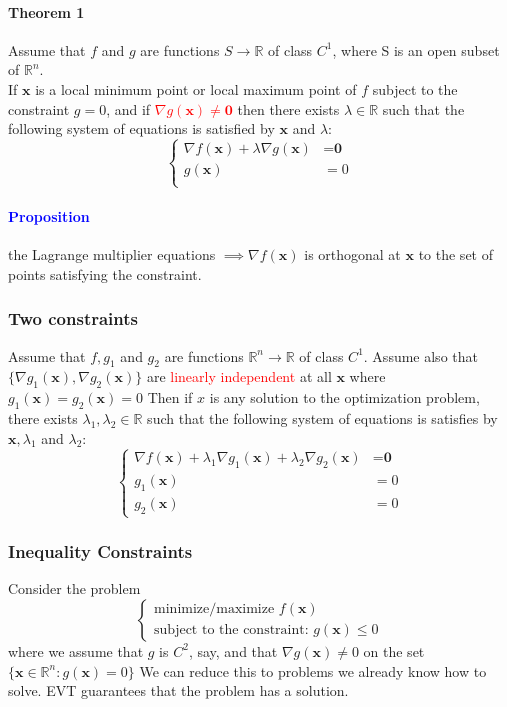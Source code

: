 \documentclass[11pt]{article}
\newcommand{\tb}[1]{\textbf{#1}}
\newcommand{\real}[0]{\mathbb{R}}
\newcommand{\vx}[0]{\tb{x}}
\newcommand{\vo}[0]{\tb{0}}
\begin{document}
\paragraph{Theorem 1}
Assume that $f$ and $g$ are functions $S \rightarrow \real$ of class $C^1$, where S is an open subset of $\real^n$.\\
If $\vx$ is a local minimum point or local maximum point of $f$ subject to the constraint $g = 0$, and if \textcolor{red}{$\nabla g(\vx) \neq \vo$} then there exists $\lambda \in \real$ such that the following system of equations is satisfied by $\vx$ and $\lambda$:
\begin{equation*}
\begin{cases}
  \nabla f(\tb{x}) + \lambda \nabla g(\tb{x}) &= \tb{0} \\
  g(\tb{x}) &= 0\\
\end{cases}
\end{equation*}


\paragraph{\textcolor{blue}{Proposition}}
the Lagrange multiplier equations $\implies \nabla f(\vx)$ is orthogonal at $\vx$ to the set of points satisfying the constraint.
\subsubsection{Two constraints}
Assume that $f, g_1$ and $g_2$ are functions $\real^n \rightarrow \real$ of class $C^1$. Assume also that $\{ \nabla g_1(\tb{x}), \nabla g_2(\tb{x})\}$ are \textcolor{red}{linearly independent} at all $\tb{x}$ where $g_1(\tb{x}) = g_2(\tb{x}) = 0$ \newline
Then if $x$ is any solution to the optimization problem, there exists $\lambda_1, \lambda_2 \in \real$ such that the following system of equations is satisfies by $\tb{x}, \lambda_1$ and $\lambda_2$:
\begin{equation*}
\begin{cases}
  \nabla f(\tb{x}) + \lambda_1 \nabla g_1(\tb{x}) + \lambda_2 \nabla g_2(\tb{x}) &= \tb{0} \\
  g_1(\tb{x}) &= 0\\
  g_2(\tb{x}) &= 0
\end{cases}
\end{equation*}
\subsubsection{Inequality Constraints}
Consider the problem
\begin{equation*}
    \begin{cases}
        \mbox{minimize/maximize } f(\tb{x})\\
        \mbox{subject to the constraint: } g(\tb{x}) \leq 0
    \end{cases}
\end{equation*}
where we assume that $g$ is $C^2$, say, and that $\nabla g(\tb{x}) \neq 0$ on the set $\{\tb{x}\in \real^n: g(\tb{x}) = 0\}$ \newline
We can reduce this to problems we already know how to solve. EVT guarantees that the problem has a solution.
\end{document}
